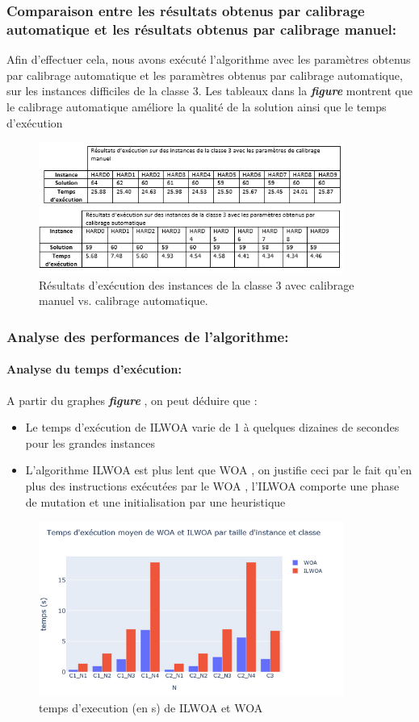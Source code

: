 \documentclass[12pt]{article}
\begin{document}
\subsubsection{Comparaison entre les résultats obtenus par calibrage automatique et les résultats obtenus par calibrage manuel:                }
Afin d’effectuer cela, nous avons exécuté l’algorithme avec les paramètres obtenus par calibrage automatique et les paramètres obtenus par calibrage automatique, sur les instances difficiles de la classe 3. Les tableaux dans la \textbf{\emph{figure }} montrent que le calibrage automatique améliore la qualité de la solution ainsi que le temps d’exécution
\begin{figure}[h!]
    \centering
     \includegraphics[width=10cm]{../figures/tabreslts.PNG}
     \caption{Résultats d'exécution des instances de la classe 3 avec calibrage manuel vs. calibrage automatique.}
     \label{tab:calib_c3}
 \end{figure}
\subsubsection{Analyse des performances de l'algorithme: }
\paragraph{Analyse du temps d'exécution:}
A partir du graphes \textbf{\emph{figure }} , on peut déduire que :
\begin{itemize}
    \item Le temps d'exécution de ILWOA varie de 1  à quelques dizaines de secondes pour les grandes instances 
    \item L’algorithme ILWOA est plus lent que WOA , on justifie ceci par le fait qu’en plus des instructions exécutées par le WOA , l’ILWOA comporte une phase de mutation et une initialisation par une heuristique  
\end{itemize}
\begin{figure}[h!]
    \centering
     \includegraphics[width=10cm]{../figures/woavsilwoatemps.PNG}
     \caption{temps d'execution (en s) de ILWOA et WOA}
    \label{fig:texec_comp}
    \end{figure}
\end{document}
